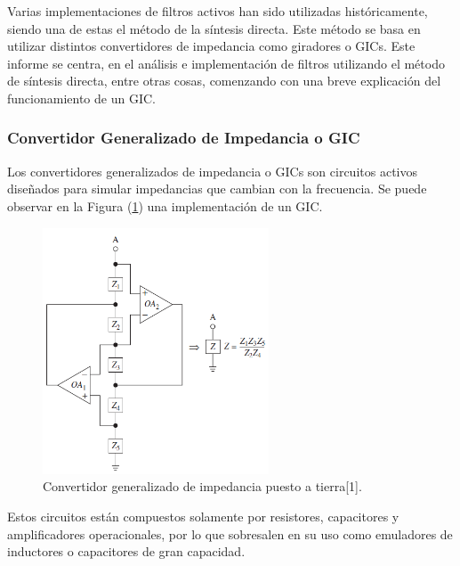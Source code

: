 Varias implementaciones de filtros activos han sido utilizadas históricamente, siendo una de estas el método de la síntesis directa. Este método se basa en utilizar distintos convertidores de impedancia como giradores o GICs. Este informe se centra, en el análisis e implementación de filtros utilizando el método de síntesis directa, entre otras cosas, comenzando con una breve explicación del funcionamiento de un GIC.

\subsubsection{Convertidor Generalizado de Impedancia o GIC}
Los convertidores generalizados de impedancia o GICs son circuitos activos diseñados para simular impedancias que cambian con la frecuencia. Se puede observar en la Figura (\ref{fig:gic}) una implementación de un GIC.

\begin{figure}[H]
	\centering
	\includegraphics[width=0.6\textwidth]{Imagenes/gic.PNG}
	\caption{Convertidor generalizado de impedancia puesto a tierra[1].}
	\label{fig:gic}
\end{figure}

Estos circuitos están compuestos solamente por resistores, capacitores y amplificadores operacionales, por lo que sobresalen en su uso como emuladores de inductores o capacitores de gran capacidad.


